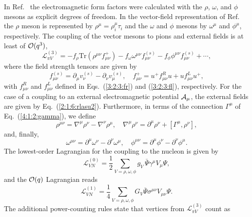 \documentclass[twoside,12pt]{article}
\begin{document}
   In Ref.\ \cite{Schindler:2005ke} the electromagnetic form factors
were calculated with the $\rho$, $\omega$, and $\phi$
mesons as explicit degrees of freedom.
   In the vector-field representation of Ref.\ \cite{Ecker:1989yg} the $\rho$ meson is
represented by $\rho^{\mu}=\rho^{\mu}_i\tau_i$ and the $\omega$ and $\phi$ mesons by
$\omega^\mu$ and $\phi^\mu$, respectively.
   The coupling of the vector mesons to pions and external fields is at least of
${\cal O}(q^3)$,
\begin{equation}\label{PionLagrange}
   \mathcal{L}_{{\pi}V}^{(3)}=-f_\rho\mbox{Tr}(\rho^{\mu\nu}f^+_{\mu\nu})
-f_\omega\omega^{\mu\nu}f^{(s)}_{\mu\nu}-f_\phi\phi^{\mu\nu}f^{(s)}_{\mu\nu}+\cdots,
\end{equation}
where the field strength tensors are given by
\begin{displaymath}
f^{(s)}_{\mu\nu}=\partial_\mu v^{(s)}_\nu-\partial_\nu
v^{(s)}_\mu,\quad
f^+_{\mu\nu}=u^+f^R_{\mu\nu}u+u f^L_{\mu\nu} u^+,
\end{displaymath}
with $f^R_{\mu\nu}$ and $f^L_{\mu\nu}$ defined in Eqs.~(\ref{3:2:3:fr}) and (\ref{3:2:3:fl}),
respectively.
   For the case of a coupling to an external electromagnetic potential ${\cal A}_\mu$,
the external fields are given by Eq.\ (\ref{2:1:6:rlasu2}).
   Furthermore, in terms of the connection $\Gamma^\mu$ of Eq.~(\ref{4:1:2:gamma}),
we define
\begin{displaymath}
    \rho^{\mu\nu}=\nabla^{\mu}\rho^{\nu}-\nabla^{\nu}\rho^{\mu},\quad
    \nabla^{\mu}\rho^{\nu}=\partial^{\mu}\rho^{\nu}+\left[\Gamma^{\mu},\rho^{\nu}\right],
\end{displaymath}
and, finally,
\begin{displaymath}
\omega^{\mu\nu}=\partial^\mu\omega^\nu-\partial^\nu\omega^\mu,\quad
\phi^{\mu\nu}=\partial^\mu\phi^\nu-\partial^\nu\phi^\mu.
\end{displaymath}
   The lowest-order Lagrangian for the coupling to the nucleon is
given by
\begin{equation}\label{LagNV0}
   \mathcal{L}_{VN}^{(0)}=\frac{1}{2}\sum_{V=\rho,\omega,\phi}g_V\,\bar{\Psi}\gamma^{\mu}V_{\mu}\Psi,
\end{equation}
and the ${\cal O}(q)$ Lagrangian reads
\begin{equation}\label{LagNV1}
   \mathcal{L}_{VN}^{(1)}=\frac{1}{4}\sum_{V=\rho,\omega,\phi}G_V
   \bar{\Psi}\sigma^{\mu\nu}V_{\mu\nu}\Psi.
\end{equation}
   The additional power-counting rules state that vertices from $\mathcal{L}_{{\pi}V}^{(3)}$ count as
\end{document}
